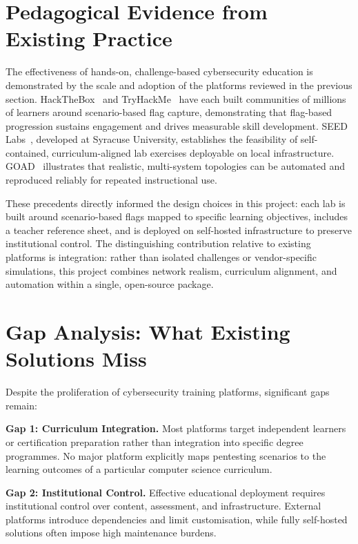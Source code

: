 \section{Pedagogical Evidence from Existing Practice}
\label{sec:pedagogical_evidence}

The effectiveness of hands-on, challenge-based cybersecurity education is demonstrated by
the scale and adoption of the platforms reviewed in the previous section.
HackTheBox~\cite{hackthebox} and TryHackMe~\cite{tryhackme} have each built communities
of millions of learners around scenario-based flag capture, demonstrating that flag-based
progression sustains engagement and drives measurable skill development.
SEED Labs~\cite{seedlabs}, developed at Syracuse University, establishes the feasibility of
self-contained, curriculum-aligned lab exercises deployable on local infrastructure.
GOAD~\cite{goad} illustrates that realistic, multi-system topologies can be automated and
reproduced reliably for repeated instructional use.

These precedents directly informed the design choices in this project: each lab is built around
scenario-based flags mapped to specific learning objectives, includes a teacher reference
sheet, and is deployed on self-hosted infrastructure to preserve institutional control.
The distinguishing contribution relative to existing platforms is integration: rather than
isolated challenges or vendor-specific simulations, this project combines network realism,
curriculum alignment, and automation within a single, open-source package.

\section{Gap Analysis: What Existing Solutions Miss}

Despite the proliferation of cybersecurity training platforms, significant gaps remain:

\textbf{Gap 1: Curriculum Integration.}
Most platforms target independent learners or certification preparation rather than integration
into specific degree programmes. No major platform explicitly maps pentesting scenarios to the
learning outcomes of a particular computer science curriculum.

\textbf{Gap 2: Institutional Control.}
Effective educational deployment requires institutional control over content, assessment, and
infrastructure. External platforms introduce dependencies and limit customisation, while
fully self-hosted solutions often impose high maintenance burdens.

